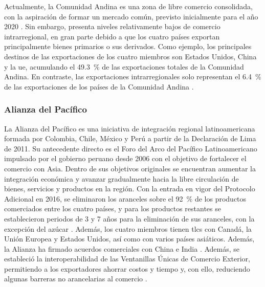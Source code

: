 Actualmente, la Comunidad Andina es una zona de libre comercio consolidada, con la aspiración de formar un mercado común, previsto inicialmente para el año 2020 \parencite[p.~226]{Sanchez2025}. Sin embargo, presenta niveles relativamente bajos de comercio intrarregional, en gran parte debido a que los cuatro países exportan principalmente bienes primarios o sus derivados. Como ejemplo, los principales destinos de las exportaciones de los cuatro miembros son Estados Unidos, China y la \gls{ue}, acumulando el 49.3~\% de las exportaciones totales de la Comunidad Andina. En contraste, las exportaciones intrarregionales solo representan el 6.4~\% de las exportaciones de los países de la Comunidad Andina \parencite[p.~227]{Sanchez2025}. 


\subsubsection{Alianza del Pacífico}

La Alianza del Pacífico es una iniciativa de integración regional latinoamericana formada por Colombia, Chile, México y Perú a partir de la Declaración de Lima de 2011. Su antecedente directo es el Foro del Arco del Pacífico Latinoamericano impulsado por el gobierno peruano desde 2006 con el objetivo de fortalecer el comercio con Asia. Dentro de sus objetivos originales se encuentran aumentar la integración económica y avanzar gradualmente hacia la libre circulación de bienes, servicios y productos en la región. Con la entrada en vigor del Protocolo Adicional en 2016, se eliminaron los aranceles sobre el 92~\% de los productos comerciados entre los cuatro países, y para los productos restantes se establecieron periodos de 3 y 7 años para la eliminación de sus aranceles, con la excepción del azúcar \parencite{AP_ProtocoloAdicional}. Además, los cuatro miembros tienen \glspl{tlc} con Canadá, la Unión Europea y Estados Unidos, así como con varios países asiáticos. Además, la Alianza ha firmado acuerdos comerciales con China e India \parencite[pp.~250--251]{Ertl2025}.  Además, se estableció la interoperabilidad de las Ventanillas Únicas de Comercio Exterior, permitiendo a los exportadores ahorrar costos y tiempo y, con ello, reduciendo algunas barreras no arancelarias al comercio \parencite{AP_9años}.

